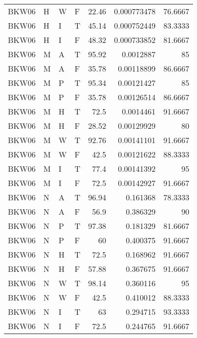 \begin{table}[!htb]
{\begin{tabular}{llllrrr}
            BKW06    & H     & W     & F          & 22.46      & 0.000773478 & 76.6667  \\
            BKW06    & H     & I     & T          & 45.14      & 0.000752449 & 83.3333  \\
            BKW06    & H     & I     & F          & 48.32      & 0.000733852 & 81.6667  \\
            BKW06    & M     & A     & T          & 95.92      & 0.0012887   & 85       \\
            BKW06    & M     & A     & F          & 35.78      & 0.00118899  & 86.6667  \\
            BKW06    & M     & P     & T          & 95.34      & 0.00121427  & 85       \\
            BKW06    & M     & P     & F          & 35.78      & 0.00126514  & 86.6667  \\
            BKW06    & M     & H     & T          & 72.5       & 0.0014461   & 91.6667  \\
            BKW06    & M     & H     & F          & 28.52      & 0.00129929  & 80       \\
            BKW06    & M     & W     & T          & 92.76      & 0.00141101  & 91.6667  \\
            BKW06    & M     & W     & F          & 42.5       & 0.00121622  & 88.3333  \\
            BKW06    & M     & I     & T          & 77.4       & 0.00141392  & 95       \\
            BKW06    & M     & I     & F          & 72.5       & 0.00142927  & 91.6667  \\
            BKW06    & N     & A     & T          & 96.94      & 0.161368    & 78.3333  \\
            BKW06    & N     & A     & F          & 56.9       & 0.386329    & 90       \\
            BKW06    & N     & P     & T          & 97.38      & 0.181329    & 81.6667  \\
            BKW06    & N     & P     & F          & 60         & 0.400375    & 91.6667  \\
            BKW06    & N     & H     & T          & 72.5       & 0.168962    & 91.6667  \\
            BKW06    & N     & H     & F          & 57.88      & 0.367675    & 91.6667  \\
            BKW06    & N     & W     & T          & 98.14      & 0.360116    & 95       \\
            BKW06    & N     & W     & F          & 42.5       & 0.410012    & 88.3333  \\
            BKW06    & N     & I     & T          & 63         & 0.294715    & 93.3333  \\
            BKW06    & N     & I     & F          & 72.5       & 0.244765    & 91.6667  \\
            \hline
        \end{tabular}
    }{}
\end{table}